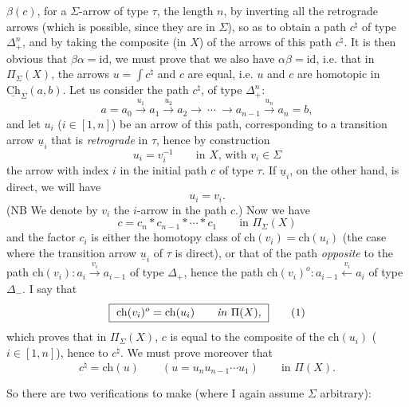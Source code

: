 \documentclass[11pt]{article}
\newcommand{\printedpage}[1]{\marginpar{\footnotesize p.~#1}}
\newcommand{\msp}[1]{\marginpar{\footnotesize [#1]}}
\newcommand{\Ch}{\underline{\mathrm{Ch}}}
\newcommand{\ch}{\mathrm{ch}}
\newcommand{\id}{\mathrm{id}}
\begin{document}
\printedpage{46}

\msp{page 69}

$\beta(c)$, for a $\Sigma$-arrow of type $\tau$, the length $n$, by inverting all the retrograde arrows (which is possible, since they are in $\Sigma$), so as to obtain a path $c^\natural$ of type $\Delta_+^n$, and by taking the composite (in $X$) of the arrows of this path $c^\natural$. It is then obvious that $\beta\alpha = \id$, we must prove that we also have $\alpha\beta = \id$, i.e. that in $\Pi_\Sigma(X)$, the arrows $u = \int c^\natural$ and $c$ are equal, i.e. $u$ and $c$ are homotopic in $\Ch_\Sigma(a,b)$. Let us consider the path $c^\natural$, of type $\Delta_+^n$: %
\[
a = a_0 \xrightarrow{u_1} a_1 \xrightarrow{u_2} a_2 \longrightarrow \ \cdots \ \longrightarrow a_{n-1} \xrightarrow{u_n} a_n = b,
\]
and let $u_i$ ($i \in [1,n]$) be an arrow of this path, corresponding to a transition arrow $\underline{u}_i$ that is \textit{retrograde} in $\tau$, hence by construction
\[
u_i = v_i^{-1} \qquad \text{in } X\text{, with } v_i \in \Sigma
\]
the arrow with index $i$ in the initial path $c$ of type $\tau$. If $\underline{u}_i$, on the other hand, is direct, we will have
\[
u_i = v_i.
\]
(NB We denote by $v_i$ the $i$-arrow in the path $c$.) Now we have
\[
c = c_n * c_{n-1} * \cdots * c_1 \qquad \text{in } \Pi_\Sigma(X)
\tag*{$(*)$}
\]
and the factor $c_i$ is either the homotopy class of $\ch(v_i) = \ch(u_i)$ (the case where the transition arrow $\underline{u}_i$ of $\tau$ is direct), or that of the path \textit{opposite} to the path $\ch(v_i) : a_i \xrightarrow{v_i} a_{i-1}$ of type $\Delta_+$, hence the path $\ch(v_i)^o : a_{i-1} \xleftarrow{v_i} a_i$ of type $\Delta_-$. I say that
\[
\boxed{\ \ch(v_i)^o = \ch(u_i) \qquad \text{\textit{in} } \Pi(X),\ }
\tag*{(1)}
\]
which proves that in $\Pi_\Sigma(X)$, $c$ is equal to the composite of the $\ch(u_i)$ ($i \in [1,n]$), hence to $c^\natural$. We must prove moreover that
\[
c^\natural = \ch(u) \qquad (u = u_nu_{n-1}\cdots u_1) \qquad \text{in } \Pi(X).
\tag*{(2)}
\]

\msp{page 70}

So there are two verifications to make (where I again assume $\Sigma$ arbitrary):
\end{document}
